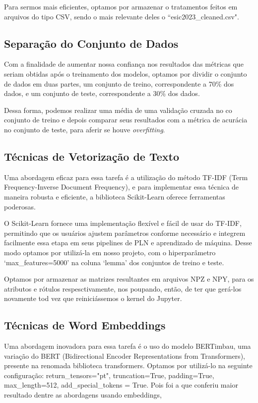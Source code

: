 Para sermos mais eficientes, optamos por armazenar o tratamentos feitos em arquivos do tipo CSV, sendo o mais relevante deles o ``esic2023\_cleaned.csv".

\subsection{Separação do Conjunto de Dados}

Com a finalidade de aumentar nossa confiança nos resultados das métricas que seriam obtidas após o treinamento dos modelos, optamos por dividir o conjunto de dados em duas partes, um conjunto de treino, correspondente a 70\% dos dados, e um conjunto de teste, correspondente a 30\% dos dados.

Dessa forma, podemos realizar uma média de uma validação cruzada no co conjunto de treino e depois comparar seus resultados com a métrica de acurácia no conjunto de teste, para aferir se houve \emph{overfitting}.
 
\subsection{Técnicas de Vetorização de Texto}

Uma abordagem eficaz para essa tarefa é a utilização do método TF-IDF (Term Frequency-Inverse Document Frequency), e para implementar essa técnica de maneira robusta e eficiente, a biblioteca Scikit-Learn oferece ferramentas poderosas.

O Scikit-Learn fornece uma implementação flexível e fácil de usar do TF-IDF, permitindo que os usuários ajustem parâmetros conforme necessário e integrem facilmente essa etapa em seus pipelines de PLN e aprendizado de máquina. Desse modo optamos por utilizá-la em nosso projeto, com o hiperparâmetro `max\_features=5000' na coluna `lemma' dos conjuntos de treino e teste.

Optamos por armazenar as matrizes resultantes em arquivos NPZ e NPY, para os atributos e rótulos respesctivamente, nos poupando, então, de ter que gerá-los novamente tod vez que reiniciássemos o kernel do Jupyter.

\subsection{Técnicas de Word Embeddings}

Uma abordagem inovadora para essa tarefa é o uso do modelo BERTimbau, uma variação do BERT (Bidirectional Encoder Representations from Transformers), presente na renomada biblioteca transformers. Optamos por utilizá-lo na seguinte configuração: return\_tensors="pt", truncation=True, padding=True, max\_length=512, add\_special\_tokens = True. Pois foi a que conferiu maior resultado dentre as abordagens usando embeddings,